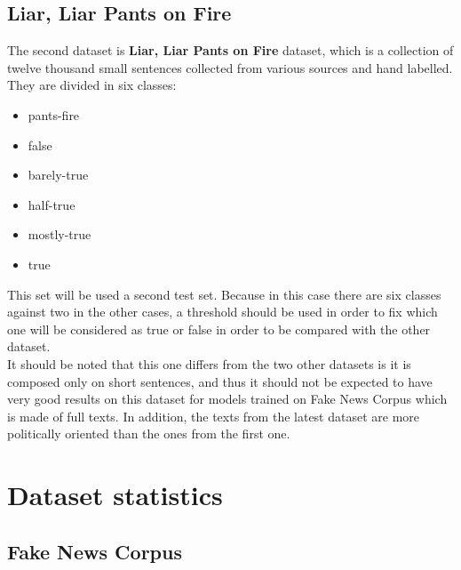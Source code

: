 \subsection{Liar, Liar Pants on Fire}
The second dataset is \textbf{Liar, Liar Pants on Fire} dataset\cite{Wang2017}, which is a collection of twelve thousand small sentences collected from various sources and hand labelled. They are divided in six classes:
\begin{itemize}
  \item pants-fire
  \item false
  \item barely-true
  \item half-true
  \item mostly-true
  \item true
\end{itemize} 
This set will be used a second test set. Because in this case there are six classes against two in the other cases, a threshold should be used in order to fix which one will be considered as true or false in order to be compared with the other dataset.  \\
It should be noted that this one differs from the two other datasets is it is composed only on short sentences, and thus it should not be expected to have very good results on this dataset for models trained on Fake News Corpus which is made of full texts. In addition, the texts from the latest dataset are more politically oriented than the ones from the first one. 
\section{Dataset statistics}
\subsection{Fake News Corpus}
